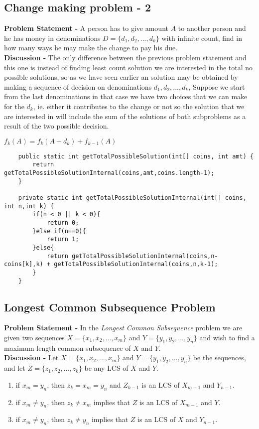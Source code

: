 \documentclass[10pt,a4paper,draft]{article}
\begin{document}
\subsection{Change making problem - 2}
\textbf{Problem Statement -} A person has to give amount $A$ to another person and he has money in denominations $D = \{d_1,d_2,...,d_k\}$ with infinite count, find in how many ways he may make the change to pay his due.
\\[12pt]
\textbf{Discussion -} The only difference between the previous problem statement and this one is instead of finding least count solution we are interested in the total no possible solutions, so as we have seen earlier an solution may be obtained by making a sequence of decision on denominations $d_1,d_2,...,d_k$, Suppose we start from the last denominations in that case we have two choices that we can make for the $d_k$, ie. either it contributes to the change or not so the solution that we are interested in will include the sum of the solutions of both subproblems as a result of the two possible decision.
\begin{center}
$f_k(A)=f_k(A-d_k) + f_{k-1}(A)$
\end{center}
\begin{lstlisting}
	public static int getTotalPossibleSolution(int[] coins, int amt) {
		return getTotalPossibleSolutionInternal(coins,amt,coins.length-1);
	}

	private static int getTotalPossibleSolutionInternal(int[] coins, int n,int k) {
		if(n < 0 || k < 0){
			return 0;
		}else if(n==0){
			return 1;
		}else{
			return getTotalPossibleSolutionInternal(coins,n-coins[k],k) + getTotalPossibleSolutionInternal(coins,n,k-1);
		}
	}
\end{lstlisting}
\subsection{Longest Common Subsequence Problem}
\textbf{Problem Statement -} In the \emph{Longest Common Subsequence} problem we are given two sequences $X=\{x_1,x_2,...,x_m\}$ and $Y=\{y_1,y_2,...,y_n\}$ and wish to find a maximum length common subsequence of $X$ and $Y$.
\\[12pt]
\textbf{Discussion -} Let  $X=\{x_1,x_2,...,x_m\}$ and $Y=\{y_1,y_2,...,y_n\}$ be the sequences, and let $Z=\{z_1,z_2,...,z_k\}$ be any LCS of $X$ and $Y$.
\begin{enumerate}
\item if $x_m=y_n$, then $z_k=x_m=y_n$ and $Z_{k-1}$ is an LCS of $X_{m-1}$ and $Y_{n-1}$.
\item if $x_m \neq y_n$, then $z_k \neq x_m$ implies that $Z$ is an LCS of $X_{m-1}$ and $Y$.
\item if $x_m \neq y_n$, then $z_k \neq y_n$ implies that $Z$ is an LCS of $X$ and $Y_{n-1}$.
\end{enumerate}
\end{document}
